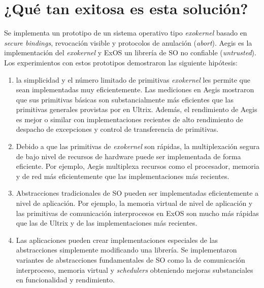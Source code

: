 \section{¿Qué tan exitosa es esta solución?} 
Se implementa un prototipo de un sistema operativo tipo \textit{exokernel} basado en \textit{secure bindings}, revocación visible y protocolos de anulación (\textit{abort}). Aegis es la implementación del \textit{exokernel} y ExOS un librería de SO no confiable (\textit{untrusted}). Los experimientos con estos prototipos demostraron las siguiente hipótesis:
\begin{enumerate}
    \item la simplicidad y el número limitado de primitivas \textit{exokernel} les permite que sean implementadas muy eficientemente. Las mediciones en Aegis mostraron que sus primitivas básicas son substancialmente más eficientes que las primitivas generales provistas por en Ultrix. Además, el rendimiento de Aegis es mejor o similar con implementaciones recientes de alto rendimiento de despacho de excepciones y control de transferencia de primitivas.
    \item Debido a que las primitivas de \textit{exokernel} son rápidas, la multiplexación segura de bajo nivel de recursos de hardware puede ser implementada de forma eficiente. Por ejemplo, Aegis multiplexa recursos como el procesador, memoria y de red más eficientemente que las implementaciones más recientes.
    \item Abstracciones tradicionales de SO pueden ser implementadas eficientemente a nivel de aplicación. Por ejemplo, la memoria virtual de nivel de aplicación y las primitivas de comunicación interprocesos en ExOS son mucho más rápidas que las de Ultrix y de las implementaciones más recientes.
    \item Las aplicaciones pueden crear implementaciones especiales de las abstracciones simplemente modificando una librería. Se implementaron variantes de abstracciones fundamentales de SO como la de comunicación interproceso, memoria virtual y \textit{schedulers} obteniendo mejoras substanciales en funcionalidad y rendimiento.
\end{enumerate}

